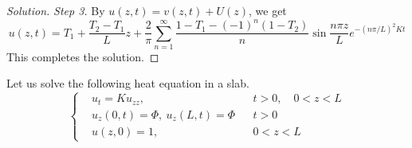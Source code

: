 \begin{proof}[Solution]
\textit{Step 3.} By $u(z, t) = v(z, t) + U(z)$, we get
    $$
    u(z, t)=T_1+\frac{T_2-T_1}{L} z+\frac{2}{\pi} \sum_{n=1}^{\infty} \frac{1-T_1-(-1)^n\left(1-T_2\right)}{n} \sin \frac{n \pi z}{L} e^{-(n \pi / L)^2 K t}
    $$       
This completes the solution.
\end{proof}

\begin{example}
Let us solve the following heat equation in a slab.
\begin{equation}
    \left\{
    \begin{aligned}
        &u_t=K u_{z z},\quad && t>0, \quad 0<z<L \\
        &u_z(0, t)=\Phi,\ u_z(L, t)=\Phi && t>0 \\
        &u(z, 0)=1,\quad && 0<z<L
    \end{aligned}
    \right.
\end{equation}
\end{example}
